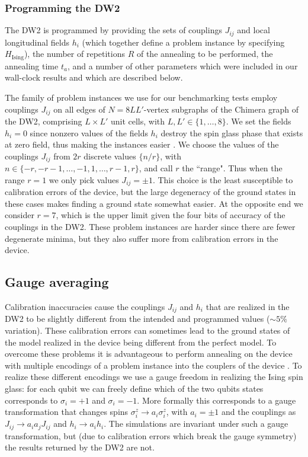 \subsubsection{Programming the DW2}
The DW2 is programmed by providing the sets of couplings $J_{ij}$ and local longitudinal fields $h_i$ (which together define a problem instance by specifying $H_{\textrm{Ising}}$), the number of repetitions $R$ of the annealing to be performed, the annealing time $t_a$, and a number of other parameters which were included in our wall-clock results and which are described below.

The family of problem instances we use for our benchmarking tests employ couplings $J_{ij}$ on all edges of $N=8LL'$-vertex subgraphs of the Chimera graph of the DW2, comprising $L\times L'$ unit cells, with $L,L'\in\{1,\dots,8\}$. We set the fields $h_i=0$ since nonzero values of the fields $h_i$ destroy the spin glass phase that exists at zero field, thus making the instances easier \cite{AT}. We choose the values of the couplings $J_{ij}$ from $2r$ discrete values  $\{n/r\}$, with $n \in \{-r, -r-1, \dots, -1, 1, \dots, r-1, r\}$, and call $r$ the ``range". Thus when the range $r=1$ we only pick values $J_{ij}=\pm 1$. This choice is the least susceptible to calibration errors of the device, but the large degeneracy of the ground states in these cases makes finding a ground state somewhat easier. At the opposite end we consider $r=7$, which is the upper limit given the four bits of accuracy of the couplings in the DW2. These problem instances are harder since there are fewer degenerate minima, but they also suffer more from calibration errors in the device.\\

\subsection{Gauge averaging}
Calibration inaccuracies cause the couplings $J_{ij}$ and $h_i$ that are realized in the DW2 to be slightly different from the intended and programmed values ($\sim 5\%$ variation). These calibration errors can sometimes lead to the ground states of the model realized in the device being different from the perfect model. To overcome these problems it is advantageous to perform annealing on the device with multiple encodings of a problem instance into the couplers of the device \cite{ourpaper}. To realize these different encodings we use a gauge freedom in realizing the Ising spin glass: for each qubit we can freely define which of the two qubits states corresponds to $\sigma_i=+1$ and  $\sigma_i=-1$. More formally this corresponds to a gauge transformation that changes spins $\sigma^z_i\rightarrow  a_i\sigma^z_i$, with $a_i=\pm1$ and the couplings as $J_{ij} \rightarrow a_ia_jJ_{ij}$ and $h_i\rightarrow a_ih_i$. The simulations are invariant under such a gauge transformation, but (due to calibration errors which break the gauge symmetry) the results returned by the DW2 are not.

